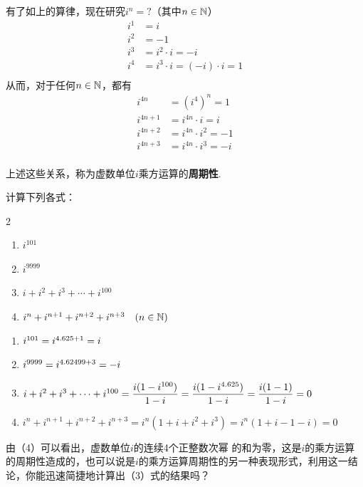 有了如上的算律，现在研究$i^n=?$（其中$n\in\mathbb{N}$）
\[\begin{split}
    i^1&=i\\
    i^2&=-1\\
    i^3&=i^2\cdot i=-i\\
    i^4&=i^3\cdot i=(-i)\cdot i=1\\
\end{split}\]
从而，对于任何$n\in\mathbb{N}$，都有
\[\begin{split}
    i^{4n}&=(i^4)^n=1\\
    i^{4n+1}&=i^{4n}\cdot i=i\\
    i^{4n+2}&=i^{4n}\cdot i^2=-1\\
    i^{4n+3}&=i^{4n}\cdot i^3=-i\\
\end{split}\]

上述这些关系，称为虚数单位$i$乘方运算的\textbf{周期性}.


\begin{example}
    计算下列各式：
\begin{multicols}{2}
\begin{enumerate}[(1)]
    \item $i^{101}$ 
    \item $i^{9999}$ 
    \item $i+i^2+i^3+\cdots+i^{100}$ 
    \item $i^{n}+i^{n+1}+i^{n+2}+i^{n+3}\quad (n\in\mathbb{N})$ 
\end{enumerate}
\end{multicols}
\end{example}

\begin{solution}
\begin{enumerate}[(1)]
    \item $i^{101}=i^{4.6 25+1}=i$ 
    \item $i^{9999}=i^{4.6 2499+3}=-i$ 
    \item $i+i^2+i^3+\cdots+i^{100}=\dfrac{i(1-i^{100})}{1-i}=\dfrac{i(1-i^{4.6 25})}{1-i}=\dfrac{i(1-1)}{1-i}=0$ 
    \item $i^{n}+i^{n+1}+i^{n+2}+i^{n+3}=i^n(1+i+i^2+i^3)=i^n(1+i-1-i)=0$ 
\end{enumerate}
\end{solution}

由（4）可以看出，虚数单位$i$的连续4个正整数次幂
的和为零，这是$i$的乘方运算的周期性造成的，也可以说是$i$的乘方运算周期性的另一种表现形式，利用这一结论，你能迅速简捷地计算出（3）式的结果吗？

